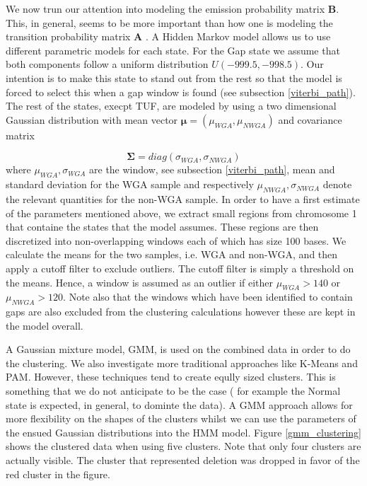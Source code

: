 We now trun our attention into modeling the  emission probability matrix $\mathbf{B}$. This, in general, seems to be more important than how one is modeling the transition probability matrix $\mathbf{A}$ \cite{rabiner2009}. A Hidden Markov model allows us to use different parametric models for each state.  For the Gap state we assume that both components follow a uniform distribution $U(-999.5, -998.5)$. Our intention is to make this state to stand out from the rest so that the model is forced to  select this when a gap window is found (see subsection \ref{viterbi_path}). The rest of the states, execpt TUF,  are modeled by using  a two dimensional Gaussian distribution with mean vector $\boldsymbol{\mu} = (\mu_{WGA}, \mu_{NWGA})$ and covariance matrix 

\begin{equation}
\boldsymbol{\Sigma} = diag(\sigma_{WGA}, \sigma_{NWGA})
\end{equation}
where $\mu_{WGA}, \sigma_{WGA}$ are the window, see subsection \ref{viterbi_path}, mean and standard  deviation for the WGA sample and respectively $\mu_{NWGA}, \sigma_{NWGA}$ denote the relevant quantities for the non-WGA sample. In order to have a first estimate of the parameters mentioned above, we extract small regions from chromosome 1 that containe the states that the model assumes. These regions are then discretized into non-overlapping windows each of which has size 100 bases.  We calculate the means for the two samples, i.e. WGA and non-WGA, and then apply a cutoff filter to exclude outliers. The cutoff filter is simply a threshold on the means. Hence, a window is assumed as an outlier if either $\mu_{WGA} > 140$ or $\mu_{NWGA} > 120$.  Note also that the windows which have been identified to contain gaps are also excluded from the clustering calculations however these are kept in the model overall. 

A Gaussian mixture model, GMM,  is used on the combined data in order to do the clustering. We also investigate more traditional approaches like K-Means and PAM. However, these techniques tend to create eqully sized clusters. This is something  that we do not anticipate to be the case ( for example the Normal state is expected, in general, to dominte the data). A GMM approach allows for more flexibility on the shapes of the clusters whilst we can use the parameters of the ensued Gaussian distributions into the HMM model.  Figure \ref{gmm_clustering} shows the clustered data when using five clusters. Note that only four clusters are actually visible. The cluster that represented deletion was dropped in favor of the  red cluster in the figure.  

